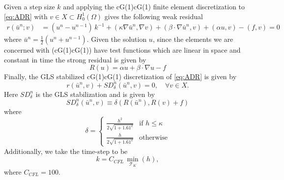     Given a step size $k$ and applying the cG(1)cG(1) finite element discretization
    to \eqref{eq:ADR} with $v \in X \subset H^1_0(\Omega)$
    gives the following weak residual
    \begin{equation}
    \begin{split}
        r(\bar{u}^n; v) &= \left(u^n - u^{n-1}\right)\,k^{-1}
            + (\kappa \nabla \bar{u}^n, \nabla v)
            + (\beta \cdot \nabla \bar{u}^n, v) + (\alpha u, v) - (f, v) = 0
    \end{split}
    \label{eqn:WeakADR}
    \end{equation}
    where $\bar{u}^n = \frac{1}{2}\left(u^n + u^{n-1}\right)$. Given the
    solution $u$, since the elements we are concerned with (cG(1)cG(1)) have
    test functions which are linear in space and constant in time the strong
    residual is given by
    \begin{equation}
        R(u) = \alpha u + \beta \cdot \nabla u - f
    \label{eqn:StrongADR}
    \end{equation}
    Finally, the GLS stabilized cG(1)cG(1) discretization of \eqref{eq:ADR} is
    given by
    \begin{equation}
        r(\bar{u}^n,v) + SD_{\delta}^n(\bar{u}^n,v) = 0,
            \quad \forall v \in X.
        \label{eqn:G2ADR}
    \end{equation}
    Here $SD_{\delta}^n$ is the GLS stabilization and is given by
    \begin{equation}
        SD_{\delta}^n(\bar{u}^n, v) \equiv \delta \left(R(\bar{u}^n), R(v)
            + f\right)
    \label{eq:ADRStabilization}
    \end{equation}
    where
    \begin{equation}
        \delta = \begin{cases}
            \frac{h^2}{2 \sqrt{1 + 1.61^2}} & \text{if } h \le \kappa \\
            \frac{h}{2 \sqrt{1 + 1.61^2}} & \text{otherwise}
        \end{cases}
        \label{eq:ADRdelta}
    \end{equation}
    Additionally, we take the time-step to be
    \begin{equation*}
    k = C_{CFL}\, \min_{\mathcal{T}_K}(h),
    \end{equation*}
    where $C_{CFL}=100$.

